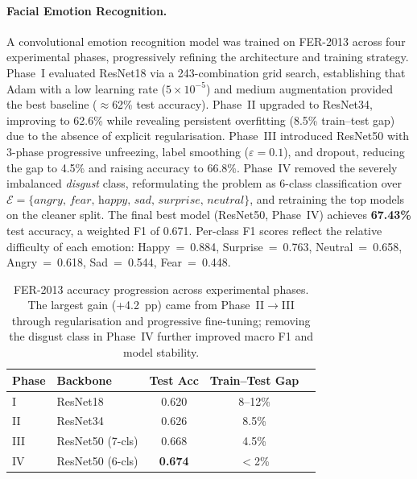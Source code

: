 \documentclass[11pt]{article}
\begin{document}
\paragraph{Facial Emotion Recognition.}
A convolutional emotion recognition model was trained on FER-2013 across four experimental
phases, progressively refining the architecture and training strategy.
Phase~I evaluated ResNet18 via a 243-combination grid search, establishing that Adam with
a low learning rate ($5{\times}10^{-5}$) and medium augmentation provided the best baseline
($\approx$62\% test accuracy).
Phase~II upgraded to ResNet34, improving to 62.6\% while revealing persistent overfitting
(8.5\% train--test gap) due to the absence of explicit regularisation.
Phase~III introduced ResNet50 with 3-phase progressive unfreezing, label smoothing
($\varepsilon{=}0.1$), and dropout, reducing the gap to 4.5\% and raising accuracy to 66.8\%.
Phase~IV removed the severely imbalanced \textit{disgust} class, reformulating the problem
as 6-class classification over
$\mathcal{E}{=}\{\textit{angry, fear, happy, sad, surprise, neutral}\}$,
and retraining the top models on the cleaner split.
The final best model (ResNet50, Phase~IV) achieves \textbf{67.43\%} test accuracy,
a weighted F1 of 0.671.
Per-class F1 scores reflect the relative difficulty of each emotion:
Happy~=~0.884, Surprise~=~0.763, Neutral~=~0.658, Angry~=~0.618, Sad~=~0.544, Fear~=~0.448.

\begin{table}[h]
\centering
\small
\begin{tabular}{llccc}
\toprule
\textbf{Phase} & \textbf{Backbone} & \textbf{Test Acc} & \textbf{Train--Test Gap} \\
\midrule
I   & ResNet18         & 0.620           & 8--12\% \\
II  & ResNet34         & 0.626           & 8.5\%   \\
III & ResNet50 (7-cls) & 0.668           & 4.5\%   \\
IV  & ResNet50 (6-cls) & \textbf{0.674}  & $<$2\% \\
\bottomrule
\end{tabular}
\caption{FER-2013 accuracy progression across experimental phases. The largest gain
(+4.2~pp) came from Phase~II$\to$III through regularisation and progressive fine-tuning;
removing the disgust class in Phase~IV further improved macro F1 and model stability.}
\label{tab:fer_progression}
\end{table}
\end{document}
